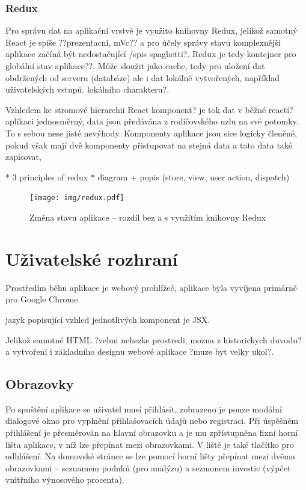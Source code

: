 \subsubsection{Redux}
Pro správu dat na aplikační vrstvě je využito knihovny Redux, jelikož samotný React je spíše ??prezentacni, mVc?? a pro účely správy stavu komplexnější aplikace začíná být nedostačující /spis spaghetti?. Redux je tedy kontejner pro globální stav aplikace??. Může sloužit jako cache, tedy pro uložení dat obdržených od serveru (databáze) ale i dat lokálně vytvořených, například uživatelských vstupů. lokálního charakteru?. 


Vzhledem ke stromové hierarchii React komponent? je tok dat v běžné reactí? aplikaci jednosměrný, data jsou předávána z rodičovského uzlu na své potomky. To s sebou nese jisté nevýhody. Komponenty aplikace jsou sice logicky členěné, pokud však mají dvě komponenty přistupovat na stejná data a tato data také zapisovat,  

* 3 principles of redux
* diagram + popis (store, view, user action, dispatch)

\begin{figure}
  \centering
  \texttt{[image: img/redux.pdf]}
  \caption{Změna stavu aplikace -- rozdíl bez a s využitím knihovny Redux \cite{redux}}
\end{figure}



\section{Uživatelské rozhraní}

Prostředím běhu aplikace je webový prohlížeč, aplikace byla vyvíjena primárně pro Google Chrome.

jazyk popisující vzhled jednotlivých komponent je JSX. 

Jelikož samotné HTML ?velmi nehezke prostredi, mozna z historickych duvodu? a vytvoření i základního designu webové aplikace ?muze byt velky ukol?. 

\subsection{Obrazovky}

Po spuštění aplikace se uživatel musí přihlásit, zobrazeno je pouze modální dialogové okno pro vyplnění přihlašovacích údajů nebo registraci. Při úspěšném přihlášení je přesměrován na hlavní obrazovku a je mu zpřístupněna fixní horní lišta aplikace, v níž lze přepínat mezi obrazovkami. V liště je také tlačítko pro odhlášení. Na domovské stránce se lze pomocí horní lišty přepínat mezi dvěma obrazovkami -- seznamem podnků (pro analýzu) a seznamem investic (výpčet vnitřního výnosového procenta).

